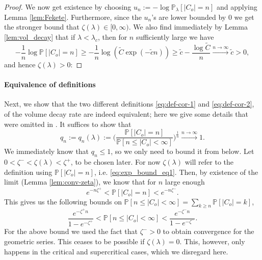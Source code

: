 \documentclass[a4paper,12pt]{scrartcl}
\renewcommand{\P}{\mathbb{P}}
\theoremstyle{definition}
\theoremstyle{remark}
\begin{document}
\begin{proof}
    We now get existence by choosing $u_n := -\log\P_{\lambda}[|C_o| = n]$ and applying Lemma \ref{lem:Fekete}. Furthermore, since the $u_n$'s are lower bounded by $0$ we get the stronger bound that $\zeta(\lambda)\in [0,\infty)$.
    We also find immediately by Lemma \ref{lem:vol_decay} that if $\lambda <\lambda_c$, then for $n$ sufficiently large we have
    \begin{equation}\label{eq:usefek}
      -\frac1n \log \P [ |C_o| =n ]
      \geq -\frac1n \log( \tilde C\exp(-\tilde cn))
      \geq
      \tilde c-\frac{\log\tilde C}{n}
      \xrightarrow{n\to\infty} \tilde c>0,
    \end{equation}
    and hence $\zeta(\lambda)>0$:
  \end{proof}

  \paragraph{Equivalence of definitions}
  Next, we show that the two different definitions \eqref{eq:def-cor-1} and \eqref{eq:def-cor-2}, of the volume decay rate are indeed equivalent; here we give some details that were omitted in \cite{penrose2003random}.
  It suffices to show that
  $$
  q_n:=q_n(\lambda):=
  \Big(
    \frac{
      \P[|C_o|=n]
    }{
      \P[n\leq |C_o|< \infty]
    }
  \Big)^\frac{1}{n}
  \xrightarrow{n\to\infty} 1.
  $$
  We immediately know that $q_n\leq 1$, so we only need to bound it from below. Let $0<\zeta^-<\zeta(\lambda)<\zeta^+$, to be chosen later. For now $\zeta(\lambda)$ will refer to the definition using $\P[|C_o|=n]$, i.e. \eqref{eq:exp_bound_eq1}. Then, by existence of the limit (Lemma \ref{lem:conv-zeta}), we know that for $n$ large enough
  \begin{equation} \label{eq:eq-one}
    e^{-n\zeta^+}
    <
    \P[|C_o|=n]
    <
    e^{-n\zeta^-}.
  \end{equation}
  This gives us the following bounds on
  $\P[n\leq|C_o|< \infty]=\sum_{k\geq n}\P[|C_o|=k]$,
  \begin{equation}\label{eq:ineq-one}
    \frac{e^{-\zeta^+n}}{1-e^{-\zeta^+}}
    <
    \P[n\leq |C_o|< \infty]
    <
    \frac{e^{-\zeta^-n}}{1-e^{-\zeta^-}}.
  \end{equation}
  For the above bound we used the fact that $\zeta^->0$ to obtain convergence for the geometric series. This ceases to be possible if $\zeta(\lambda)=0$. This, however, only happens in the critical and supercritical cases, which we disregard here.
\end{document}
